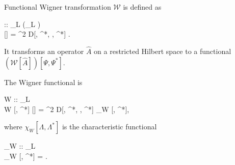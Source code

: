 \begin{definition}
	Functional Wigner transformation $\mathcal{W}$ is defined as
	\begin{eqn*}
	\label{eqn:func-wigner:w-transformation}
		 :: _L \rightarrow (_L \rightarrow {}) \\
		[]
		=  \int \delta^2 \Lambda
			D[\Lambda, \Lambda^*, \Psi, \Psi^*]
			\Trace{ \hat{A} \hat{D}[\Lambda, \Lambda^*] }.
	\end{eqn*}
	It transforms an operator $\hat{A}$ on a restricted Hilbert space to a functional $(\mathcal{W}[\hat{A}])[\Psi, \Psi^*]$.
\end{definition}

\begin{definition}
\label{def:func-wigner:w-functional}
	The Wigner functional is
	\begin{eqn*}
		W :: _L \rightarrow \mathbb{C} \\
		W [\Psi, \Psi^*]
		\equiv {}[\hat{\rho}]
		=  \int \delta^2 \Lambda
			D[\Lambda, \Lambda^*, \Psi, \Psi^*]
			\chi_W [\Lambda, \Lambda^*],
	\end{eqn*}
	where $\chi_W [\Lambda, \Lambda^*]$ is the characteristic functional
	\begin{eqn*}
		\chi_W :: _L \rightarrow \mathbb{R} \\
		\chi_W [\Lambda, \Lambda^*]
		= \Trace{ \hat{\rho} \hat{D}[\Lambda, \Lambda^*] }.
	\end{eqn*}
\end{definition}

